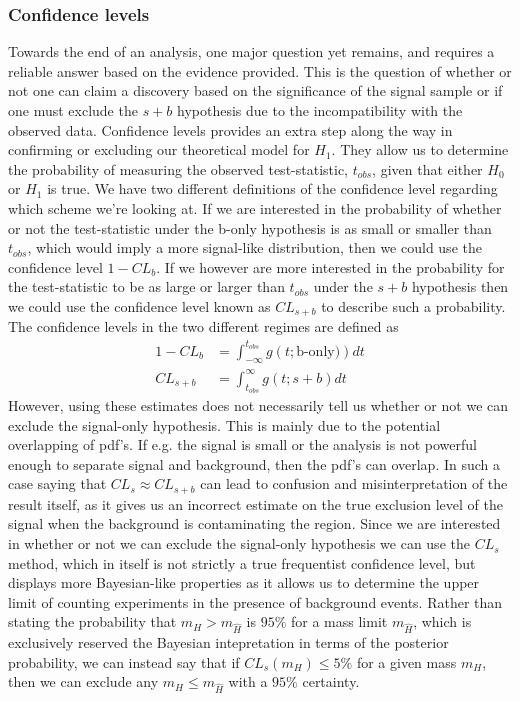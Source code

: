 \documentclass[12pt,a4paper]{amsart}
\begin{document}
\subsubsection{Confidence levels} \label{subsubsec:Theory-(p-values and significance)-(confidence-levels)}
Towards the end of an analysis, one major question yet remains, and requires a reliable answer based on the evidence provided. This is the question of whether or not one can claim a discovery based on the significance of the signal sample or if one must exclude the $s+b$ hypothesis due to the incompatibility with the observed data. Confidence levels provides an extra step along the way in confirming or excluding our theoretical model for $H_1$.
They allow us to determine the probability of measuring the observed test-statistic, $t_{obs}$, given that either $H_0$ or $H_1$ is true. We have two different definitions of the confidence level regarding which scheme we're looking at. If we are interested in the probability of whether or not the test-statistic under the b-only hypothesis is as small or smaller than $t_{obs}$, which would imply a more signal-like distribution, then we could use the confidence level $1-CL_b$. If we however are more interested in the probability for the test-statistic to be as large or larger than $t_{obs}$ under the $s+b$ hypothesis then we could use the confidence level known as $CL_{s+b}$ to describe such a probability. The confidence levels in the two different regimes are defined as
\begin{align}
1-CL_b &= \int_{-\infty}^{t_{obs}} g(t;\text{b-only)})dt \label{eq:1-CL_b}\\
CL_{s+b} &= \int_{t_{obs}}^\infty g(t;s+b)dt	\label{eq:CL_s+b}
\end{align}
However, using these estimates does not necessarily tell us whether or not we can exclude the signal-only hypothesis. This is mainly due to the potential overlapping of pdf's. If e.g. the signal is small or the analysis is not powerful enough to separate signal and background, then the pdf's can overlap. In such a case saying that $CL_s \approx CL_{s+b}$ can lead to confusion and misinterpretation of the result itself, as it gives us an incorrect estimate on the true exclusion level of the signal when the background is contaminating the region. Since we are interested in whether or not we can exclude the signal-only hypothesis we can use the $CL_s$ method\cite{Read_2002:CLs}, which in itself is not strictly a true frequentist confidence level, but displays more Bayesian-like properties as it allows us to determine the upper limit of counting experiments in the presence of background events. Rather than stating the probability that $m_H > m_{\hat{H}}$ is $95\%$ for a mass limit $m_{\hat{H}}$, which is exclusively reserved the Bayesian intepretation in terms of the posterior probability, we can instead say that if $CL_s(m_H) \leq 5\%$ for a given mass $m_H$, then we can exclude any $m_H \leq m_{\hat{H}}$ with a $95\%$ certainty. 
\end{document}
